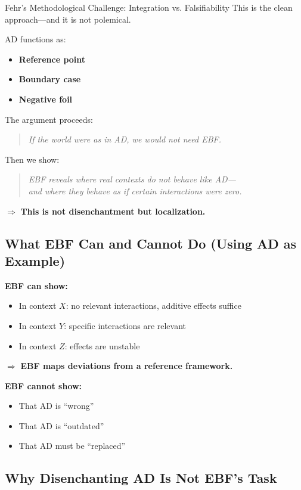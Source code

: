 \begin{chapter}{Fehr's Methodological Challenge: Integration vs. Falsifiability}
This is the clean approach---and it is not polemical.

AD functions as:
\begin{itemize}[noitemsep]
    \item \textbf{Reference point}
    \item \textbf{Boundary case}
    \item \textbf{Negative foil}
\end{itemize}

The argument proceeds:

\begin{quote}
\textit{If the world were as in AD, we would not need EBF.}
\end{quote}

Then we show:

\begin{quote}
\textit{EBF reveals where real contexts do not behave like AD---\\
and where they behave as if certain interactions were zero.}
\end{quote}

$\Rightarrow$ \textbf{This is not disenchantment but localization.}

\subsection{What EBF Can and Cannot Do (Using AD as Example)}

\textbf{EBF can show:}
\begin{itemize}[noitemsep]
    \item In context $X$: no relevant interactions, additive effects suffice
    \item In context $Y$: specific interactions are relevant
    \item In context $Z$: effects are unstable
\end{itemize}

$\Rightarrow$ \textbf{EBF maps deviations from a reference framework.}

\textbf{EBF cannot show:}
\begin{itemize}[noitemsep]
    \item That AD is ``wrong''
    \item That AD is ``outdated''
    \item That AD must be ``replaced''
\end{itemize}

\subsection{Why Disenchanting AD Is Not EBF's Task}


\end{chapter}

